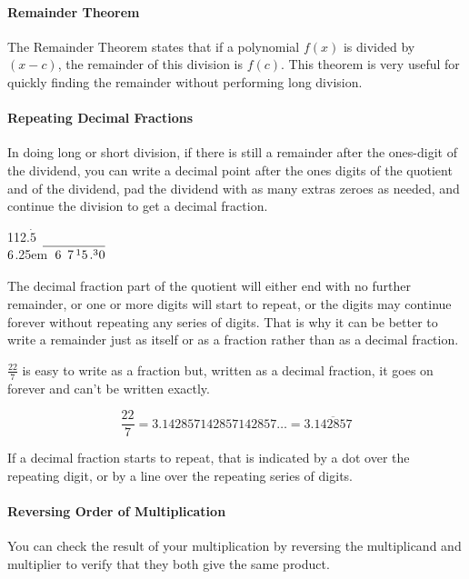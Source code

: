 \documentclass[12pt]{article}
\newcommand\mylongdiv[2]{%
$\strut#1$\kern.25em\smash{\raise.3ex\hbox{$\big)$}}$\mkern-8mu\overline{\quad\strut#2}$}
\begin{document}
\paragraph{Remainder Theorem}
The Remainder Theorem states that if a polynomial $f(x)$ is divided by $(x - c)$, the remainder of this division is $f(c)$. This theorem is very useful for quickly finding the remainder without performing long division.

\paragraph{Repeating Decimal Fractions}
In doing long or short division, if there is still a remainder after the ones-digit of the dividend, you can write a decimal point after the ones digits of the quotient and of the dividend, pad the dividend with as many extras zeroes as needed, and continue the division to get a decimal fraction.
\begin{center}
\hspace*{4.2ex}1\hspace{1ex}1\hspace{0.9ex}2\hspace{0.3ex}.\hspace{0.8ex}\ensuremath{\dot{5}}\\
\mylongdiv{6}{6\hspace{1.1ex}7\hspace{0.4ex}{^1}5\hspace{0.3ex}.^30}\\
\end{center}

The decimal fraction part of the quotient will either end with no further remainder, or one or more digits will start to repeat, or the digits may continue forever without repeating any series of digits. That is why it can be better to write a remainder just as itself or as a fraction rather than as a decimal fraction.

$\frac{22}{7}$ is easy to write as a fraction but, written as a decimal fraction, it goes on forever and can't be written exactly.

$$\frac{22}{7}=3.142857142857142857\ldots=3.\overline{142857}$$

If a decimal fraction starts to repeat, that is indicated by a dot over the repeating digit, or by a line over the repeating series of digits.\\

\paragraph{Reversing Order of Multiplication}
You can check the result of your multiplication by reversing the multiplicand and multiplier to verify that they both give the same product.
\end{document}
